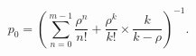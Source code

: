 \begin{equation}
    p_0=\left(\sum_{n=0}^{m-1} \frac{\rho^n}{n !}+\frac{\rho^k}{k !} \times \frac{k}{k-\rho}\right)^{-1} .
\end{equation}